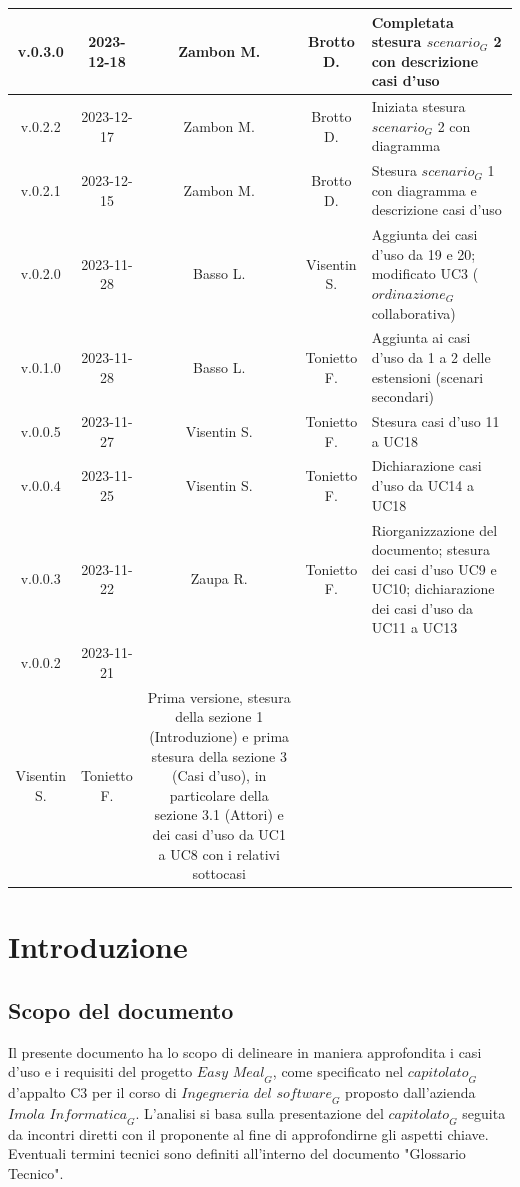 \documentclass[12pt, oneside]{article}
\begin{document}
\begin{longtable}{|c|c|c|c|p{7cm}|}
\hline
v.0.3.0 & 2023-12-18 & Zambon M. & Brotto D. & Completata stesura $\textit{scenario}_G$ 2 con descrizione casi d'uso \\
\hline
v.0.2.2 & 2023-12-17 & Zambon M. & Brotto D. & Iniziata stesura $\textit{scenario}_G$ 2 con diagramma \\
\hline
v.0.2.1 & 2023-12-15 & Zambon M. & Brotto D. & Stesura $\textit{scenario}_G$ 1 con diagramma e descrizione casi d'uso \\
\hline
v.0.2.0 & 2023-11-28 & Basso L. & Visentin S. & Aggiunta dei casi d'uso da 19 e 20; modificato UC3 ($\textit{ordinazione}_G$ collaborativa) \\
\hline
v.0.1.0 & 2023-11-28 & Basso L. & Tonietto F. & Aggiunta ai casi d'uso da 1 a 2 delle estensioni (scenari secondari) \\
\hline
v.0.0.5 & 2023-11-27 & Visentin S. & Tonietto F. & Stesura casi d'uso 11 a UC18 \\
\hline
v.0.0.4 & 2023-11-25 & Visentin S. & Tonietto F. & Dichiarazione casi d'uso da UC14 a UC18 \\
\hline
v.0.0.3 & 2023-11-22 & Zaupa R. & Tonietto F. & Riorganizzazione del documento; stesura dei casi d'uso UC9 e UC10; dichiarazione dei casi d'uso da UC11 a UC13 \\
\hline
v.0.0.2 & 2023-11-21 & 
  \begin{tabular}[c]{@{}c@{}}
    Zaupa R. \\
    Visentin S.
  \end{tabular} 
  & Tonietto F. & Prima versione, stesura della sezione 1 (Introduzione) e prima stesura della sezione 3 (Casi d'uso), in particolare della sezione 3.1 (Attori) e dei casi d'uso da UC1 a UC8 con i relativi sottocasi\\
\hline
\end{longtable}
\newpage

\tableofcontents
\newpage

\section{Introduzione}
\subsection{Scopo del documento}
Il presente documento ha lo scopo di delineare in maniera approfondita i casi d'uso e i requisiti del progetto $\textit{Easy Meal}_G$, come specificato nel $\textit{capitolato}_G$ d'appalto C3 per il corso di $\textit{Ingegneria del software}_G$ proposto dall'azienda $\textit{Imola Informatica}_G$.
L'analisi si basa sulla presentazione del $\textit{capitolato}_G$ seguita da incontri diretti con il proponente al fine di approfondirne gli aspetti chiave. Eventuali termini tecnici sono definiti all'interno del documento "Glossario Tecnico".
\end{document}
